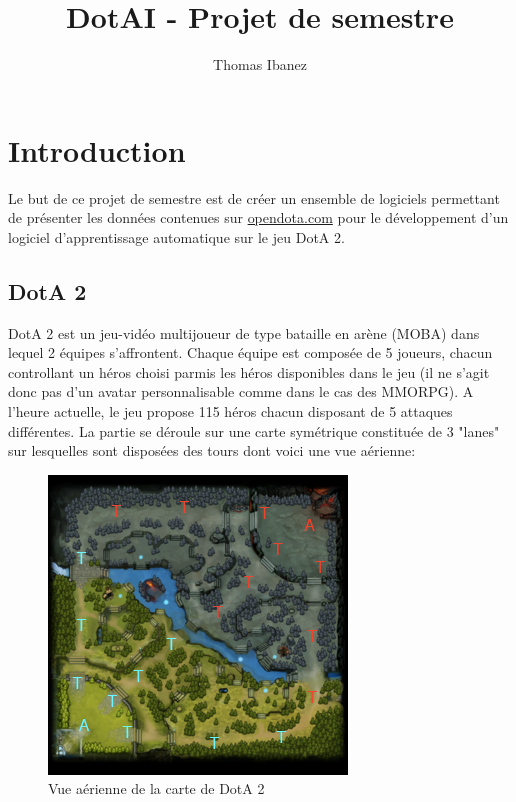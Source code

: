 \documentclass{article}
\title{DotAI - Projet de semestre}
\author{Thomas Ibanez}
\begin{document}
\maketitle

\newpage
\tableofcontents

\newpage

\section{Introduction}

Le but de ce projet de semestre est de créer un ensemble de logiciels permettant de présenter les données contenues sur \url{opendota.com} pour le développement d'un logiciel d'apprentissage automatique sur le jeu DotA 2.

\subsection{DotA 2}

DotA 2 est un jeu-vidéo multijoueur de type bataille en arène (MOBA) dans lequel 2 équipes s'affrontent. Chaque équipe est composée de 5 joueurs, chacun controllant un héros choisi parmis les héros disponibles dans le jeu (il ne s'agit donc pas d'un avatar personnalisable comme dans le cas des MMORPG). A l'heure actuelle, le jeu propose 115 héros chacun disposant de 5 attaques différentes. La partie se déroule sur une carte symétrique constituée de 3 "lanes" sur lesquelles sont disposées des tours dont voici une vue aérienne: \\

\begin{figure}[h]
\begin{center}
	\includegraphics[scale=1]{"minimap.png"} 
	\caption{Vue aérienne de la carte de DotA 2}
\end{center}
\end{figure}	
\end{document}
